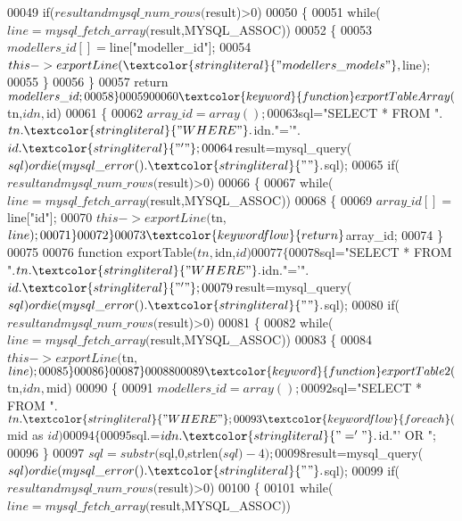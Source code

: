 \begin{DoxyCode}
00049     \textcolor{keywordflow}{if}($result and mysql\_num\_rows($result)>0)
00050     \{
00051       \textcolor{keywordflow}{while}($line=mysql\_fetch\_array($result,MYSQL\_ASSOC))
00052       \{
00053         $modellers\_id[]=$line[\textcolor{stringliteral}{"modeller\_id"}];
00054         $this->exportLine(\textcolor{stringliteral}{"modellers\_models"},$line);
00055       \}
00056     \}
00057     \textcolor{keywordflow}{return} $modellers\_id;
00058   \}
00059     
00060   \textcolor{keyword}{function} exportTableArray($tn,$idn,$id)
00061   \{
00062     $array\_id=array();
00063     $sql=\textcolor{stringliteral}{"SELECT * FROM "}.$tn.\textcolor{stringliteral}{" WHERE "}.$idn.\textcolor{stringliteral}{"='"}.$id.\textcolor{stringliteral}{"'"};
00064     $result=mysql\_query($sql) or die(mysql\_error().\textcolor{stringliteral}{" "}.$sql);
00065     \textcolor{keywordflow}{if}($result and mysql\_num\_rows($result)>0)
00066     \{
00067       \textcolor{keywordflow}{while}($line=mysql\_fetch\_array($result,MYSQL\_ASSOC))
00068       \{
00069         $array\_id[]=$line[\textcolor{stringliteral}{"id"}];
00070         $this->exportLine($tn,$line);
00071       \}
00072     \}
00073     \textcolor{keywordflow}{return} $array\_id;
00074   \}
00075 
00076   \textcolor{keyword}{function} exportTable($tn,$idn,$id)
00077   \{
00078     $sql=\textcolor{stringliteral}{"SELECT * FROM "}.$tn.\textcolor{stringliteral}{" WHERE "}.$idn.\textcolor{stringliteral}{"='"}.$id.\textcolor{stringliteral}{"'"};
00079     $result=mysql\_query($sql) or die(mysql\_error().\textcolor{stringliteral}{" "}.$sql);
00080     \textcolor{keywordflow}{if}($result and mysql\_num\_rows($result)>0)
00081     \{
00082       \textcolor{keywordflow}{while}($line=mysql\_fetch\_array($result,MYSQL\_ASSOC))
00083       \{
00084         $this->exportLine($tn,$line);
00085       \}
00086     \}
00087   \}
00088   
00089   \textcolor{keyword}{function} exportTable2($tn,$idn,$mid)
00090   \{
00091     $modellers\_id=array();
00092     $sql=\textcolor{stringliteral}{"SELECT * FROM "}.$tn.\textcolor{stringliteral}{" WHERE "};
00093     \textcolor{keywordflow}{foreach}($mid as $id)
00094     \{
00095       $sql.=$idn.\textcolor{stringliteral}{"='"}.$id.\textcolor{stringliteral}{"' OR "};
00096     \}
00097     $sql=substr($sql,0,strlen($sql)-4);
00098     $result=mysql\_query($sql) or die(mysql\_error().\textcolor{stringliteral}{" "}.$sql);
00099     \textcolor{keywordflow}{if}($result and mysql\_num\_rows($result)>0)
00100     \{
00101       \textcolor{keywordflow}{while}($line=mysql\_fetch\_array($result,MYSQL\_ASSOC))

\end{DoxyCode}
